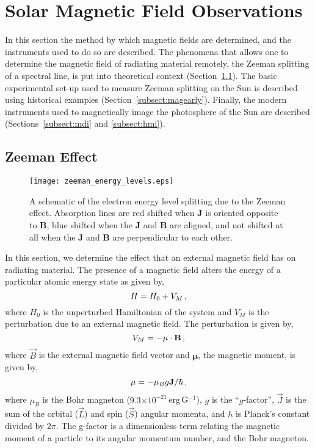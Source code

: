 \section{Solar Magnetic Field Observations}\label{sect:magobsintro}

In this section the method by which magnetic fields are determined, and the instruments used to do so are described. The phenomena that allows one to determine the magnetic field of radiating material remotely, the Zeeman splitting of a spectral line, is put into theoretical context (Section~\ref{sect:zeeman}). The basic experimental set-up used to measure Zeeman splitting on the Sun is described using historical examples (Section~\ref{subsect:magearly}). Finally, the modern instruments used to magnetically image the photosphere of the Sun are described (Sections~\ref{subsect:mdi} and \ref{subsect:hmi}).

\subsection{Zeeman Effect}\label{sect:zeeman}

\begin{figure}[!t]
\centerline{\texttt{[image: zeeman\_energy\_levels.eps]}}
\caption[A schematic of Zeeman energy level splitting.]{A schematic of the electron energy level splitting due to the Zeeman effect. Absorption lines are red shifted when $\mathbf{J}$ is oriented opposite to $\mathbf{B}$, blue shifted when the $\mathbf{J}$ and $\mathbf{B}$ are aligned, and not shifted at all when the $\mathbf{J}$ and $\mathbf{B}$ are perpendicular to each other.}
\label{fig:zeemanlevels}
\end{figure}

In this section, we determine the effect that an external magnetic field has on radiating material. 
The presence of a magnetic field alters the energy of a particular atomic energy state as given by,
\begin{equation}
H = H_{0}+V_{M} \mbox{\,,}
\end{equation}
where $H_{0}$ is the unperturbed Hamiltonian of the system and $V_{M}$ is the perturbation due to an external magnetic field. The perturbation is given by,
\begin{equation}\label{eqn:energyperturb}
V_{M}=-\mathbf{\mu}\cdot\vec{B} \mbox{\,,}
\end{equation}
where $\vec{B}$ is the external magnetic field vector and $\mathbf{\mu}$, the magnetic moment, is given by,
\begin{equation}
\mathbf{\mu}=-\mu_{B}g \vec{J}/\hbar \mbox{\,,}
\end{equation}
where $\mu_{B}$ is the Bohr magneton ($9.3$$\times$$10^{-21}$\,erg\,G$^{-1}$), $g$ is the ``$g$-factor'', $\vec{J}$ is the sum of the orbital ($\vec{L}$) and spin ($\vec{S}$) angular momenta, and $\hbar$ is Planck's constant divided by $2\pi$. The g-factor is a dimensionless term relating the magnetic moment of a particle to its angular momentum number, and the Bohr magneton.

